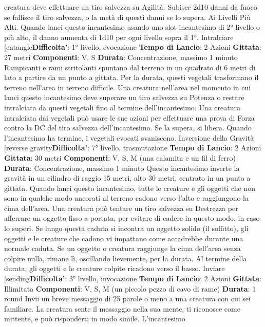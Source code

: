 \begin{multicols}{2}
creatura deve effettuare un tiro salvezza su Agilità.
Subisce 2d10 danni da fuoco se fallisce il tiro salvezza,
o la metà di questi danni se lo supera.
Ai Livelli Più Alti. Quando lanci questo incantesimo
usando uno slot incantesimo di 2° livello o più alto, il
danno aumenta di 1d10 per ogni livello sopra il 1°.
Intralciare
[entangle\textbf{Difficolta'}:
1° livello, evocazione
\textbf{Tempo di Lancio}: 2 Azioni
\textbf{Gittata}: 27 metri
\textbf{Componenti}: V, S
\textbf{Durata}: Concentrazione, massimo 1 minuto
Rampicanti e rami stritolanti spuntano dal terreno in un
quadrato di 6 metri di lato a partire da un punto a
gittata. Per la durata, questi vegetali trasformano il
terreno nell’area in terreno difficile.
Una creatura nell’area nel momento in cui lanci questo
incantesimo deve superare un tiro salvezza su Potenza o
restare intralciata da questi vegetali fino al termine
dell’incantesimo. Una creatura intralciata dai vegetali
può usare le sue azioni per effettuare una prova di
Forza contro la DC del tiro salvezza dell’incantesimo.
Se la supera, si libera.
Quando l’incantesimo ha termine, i vegetali evocati
svaniscono.
Inversione della Gravità
[reverse gravity\textbf{Difficolta'}:
7° livello, trasmutazione
\textbf{Tempo di Lancio}: 2 Azioni
\textbf{Gittata}: 30 metri
\textbf{Componenti}: V, S, M (una calamita e un fil di ferro)
\textbf{Durata}: Concentrazione, massimo 1 minuto
Questo incantesimo inverte la gravità in un cilindro di
raggio 15 metri, alto 30 metri, centrato in un punto a
gittata. Quando lanci questo incantesimo, tutte le
creature e gli oggetti che non sono in qualche modo
ancorati al terreno cadono verso l’alto e raggiungono la
cima dell’area. Una creatura può tentare un tiro
salvezza su Destrezza per afferrare un oggetto fisso a
portata, per evitare di cadere in questo modo, in caso lo
superi.
Se lungo questa caduta si incontra un oggetto solido (il
soffitto), gli oggetti e le creature che cadono vi
impattano come accadrebbe durante una normale
caduta. Se un oggetto o creatura raggiunge la cima
dell’area senza colpire nulla, rimane lì, oscillando
lievemente, per la durata.
Al termine della durata, gli oggetti e le creature colpite
ricadono verso il basso.
Inviare
[sending\textbf{Difficolta'}:
3° livello, invocazione
\textbf{Tempo di Lancio}: 2 Azioni
\textbf{Gittata}: Illimitata
\textbf{Componenti}: V, S, M (un piccolo pezzo di cavo di
rame)
\textbf{Durata}: 1 round
Invii un breve messaggio di 25 parole o meno a una
creatura con cui sei familiare. La creatura sente il
messaggio nella sua mente, ti riconosce come mittente,
e può risponderti in modo simile. L’incantesimo

\end{multicols}
